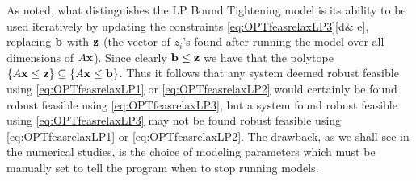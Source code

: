 As noted, what distinguishes the LP Bound Tightening model is its ability to be used iteratively by updating the constraints \eqref{eq:OPTfeasrelaxLP3}[d\& e], replacing $\bold b$ with $\bold z$ (the vector of $z_i$'s found after running the model over all dimensions of $A\bold x$). 
Since clearly $\bold b\leq \bold z$ we have that the polytope $\{A\bold x\leq \bold z\}\subseteq\{A\bold x\leq \bold b\}$. 
Thus it follows that any system deemed robust feasible using \eqref{eq:OPTfeasrelaxLP1} or \eqref{eq:OPTfeasrelaxLP2} would certainly be found robust feasible using \eqref{eq:OPTfeasrelaxLP3}, but a system found robust feasible using \eqref{eq:OPTfeasrelaxLP3} may not be found robust feasible using \eqref{eq:OPTfeasrelaxLP1} or \eqref{eq:OPTfeasrelaxLP2}. 
The drawback, as we shall see in the numerical studies, is the choice of modeling parameters which must be manually set to tell the program when to stop running models. 

